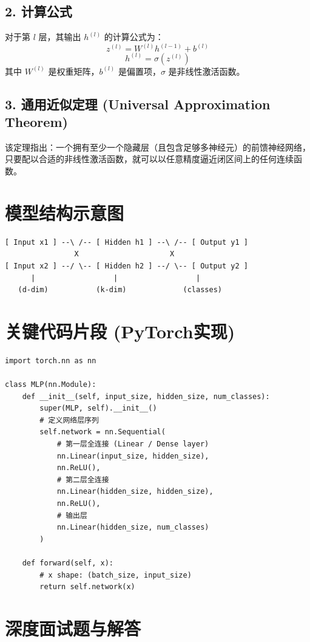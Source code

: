 \documentclass[12pt, a4paper]{book}
\begin{document}
\subsection{2. 计算公式}
对于第 $l$ 层，其输出 $h^{(l)}$ 的计算公式为：
$$ z^{(l)} = W^{(l)} h^{(l-1)} + b^{(l)} $$
$$ h^{(l)} = \sigma(z^{(l)}) $$
其中 $W^{(l)}$ 是权重矩阵，$b^{(l)}$ 是偏置项，$\sigma$ 是非线性激活函数。

\subsection{3. 通用近似定理 (Universal Approximation Theorem)}
该定理指出：一个拥有至少一个隐藏层（且包含足够多神经元）的前馈神经网络，只要配以合适的非线性激活函数，就可以以任意精度逼近闭区间上的任何连续函数。

\section{模型结构示意图}
\begin{verbatim}
[ Input x1 ] --\ /-- [ Hidden h1 ] --\ /-- [ Output y1 ]
                X                     X
[ Input x2 ] --/ \-- [ Hidden h2 ] --/ \-- [ Output y2 ]
      |                  |                  |
   (d-dim)           (k-dim)             (classes)
\end{verbatim}

\section{关键代码片段 (PyTorch实现)}
\begin{lstlisting}
import torch.nn as nn

class MLP(nn.Module):
    def __init__(self, input_size, hidden_size, num_classes):
        super(MLP, self).__init__()
        # 定义网络层序列
        self.network = nn.Sequential(
            # 第一层全连接 (Linear / Dense layer)
            nn.Linear(input_size, hidden_size),
            nn.ReLU(),
            # 第二层全连接
            nn.Linear(hidden_size, hidden_size),
            nn.ReLU(),
            # 输出层
            nn.Linear(hidden_size, num_classes)
        )

    def forward(self, x):
        # x shape: (batch_size, input_size)
        return self.network(x)
\end{lstlisting}

\section{深度面试题与解答}
\end{document}
